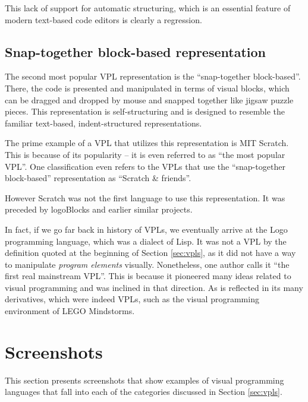 This lack of support for automatic structuring, which is an essential feature of
modern text-based code editors is clearly a regression.


\subsection{Snap-together block-based representation}
The second most popular VPL representation is the ``snap-together block-based''. There, the code is presented and manipulated in terms of visual blocks, which can be dragged and dropped by mouse and snapped together like jigsaw puzzle pieces. This representation is self-structuring and is designed to resemble the familiar text-based, indent-structured representations.

The prime example of a VPL that utilizes this representation is MIT Scratch. This is because of its popularity\cite[Section~Community of users]{scratch_wikipedia} -- it is even referred to as ``the most popular VPL''\cite{vpl_infograph}. One classification even refers to the VPLs that use the ``snap-together block-based'' representation as ``Scratch \& friends''\cite[Section~Types~of~VPLs]{vpl_maturity}.

However Scratch was not the first language to use this representation. It was preceded by logoBlocks and earlier similar projects\cite{vpl_history}.

In fact, if we go far back in history of VPLs, we eventually arrive at the Logo programming language, which was a dialect of Lisp\cite{logo_history, logo_wikipedia}. It was not a VPL by the definition quoted at the beginning of Section \ref{sec:vpls}, as it did not have a way to manipulate \textit{program elements} visually. Nonetheless, one author calls it ``the first real mainstream VPL''\cite{vpl_infograph}. This is because it pioneered many ideas related to visual programming and was inclined in that direction. As is reflected in its many derivatives, which were indeed VPLs\cite{cricket_logo}, such as the visual programming environment of LEGO Mindstorms\cite{mindstorms_history, mindstorms_wikipedia, mindstorms_site}.


\clearpage
\section{Screenshots}\label{sec:screenshots}
This section presents screenshots that show examples of visual programming languages that fall into each of the categories discussed in Section \ref{sec:vpls}.

